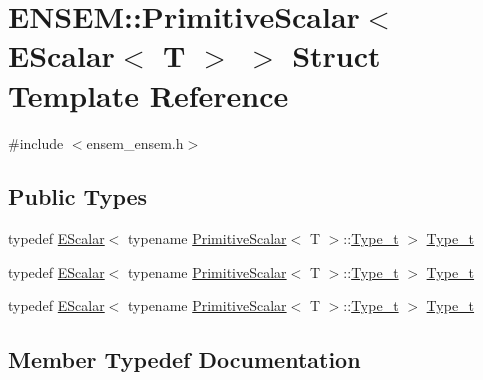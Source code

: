 \hypertarget{structENSEM_1_1PrimitiveScalar_3_01EScalar_3_01T_01_4_01_4}{}\section{E\+N\+S\+EM\+:\+:Primitive\+Scalar$<$ E\+Scalar$<$ T $>$ $>$ Struct Template Reference}
\label{structENSEM_1_1PrimitiveScalar_3_01EScalar_3_01T_01_4_01_4}


{\ttfamily \#include $<$ensem\+\_\+ensem.\+h$>$}

\subsection*{Public Types}
\begin{DoxyCompactItemize}
\item 
typedef \mbox{\hyperlink{classENSEM_1_1EScalar}{E\+Scalar}}$<$ typename \mbox{\hyperlink{structENSEM_1_1PrimitiveScalar}{Primitive\+Scalar}}$<$ T $>$\+::\mbox{\hyperlink{structENSEM_1_1PrimitiveScalar_3_01EScalar_3_01T_01_4_01_4_ae8493f2baf01f4ada1e2aec48076b72d}{Type\+\_\+t}} $>$ \mbox{\hyperlink{structENSEM_1_1PrimitiveScalar_3_01EScalar_3_01T_01_4_01_4_ae8493f2baf01f4ada1e2aec48076b72d}{Type\+\_\+t}}
\item 
typedef \mbox{\hyperlink{classENSEM_1_1EScalar}{E\+Scalar}}$<$ typename \mbox{\hyperlink{structENSEM_1_1PrimitiveScalar}{Primitive\+Scalar}}$<$ T $>$\+::\mbox{\hyperlink{structENSEM_1_1PrimitiveScalar_3_01EScalar_3_01T_01_4_01_4_ae8493f2baf01f4ada1e2aec48076b72d}{Type\+\_\+t}} $>$ \mbox{\hyperlink{structENSEM_1_1PrimitiveScalar_3_01EScalar_3_01T_01_4_01_4_ae8493f2baf01f4ada1e2aec48076b72d}{Type\+\_\+t}}
\item 
typedef \mbox{\hyperlink{classENSEM_1_1EScalar}{E\+Scalar}}$<$ typename \mbox{\hyperlink{structENSEM_1_1PrimitiveScalar}{Primitive\+Scalar}}$<$ T $>$\+::\mbox{\hyperlink{structENSEM_1_1PrimitiveScalar_3_01EScalar_3_01T_01_4_01_4_ae8493f2baf01f4ada1e2aec48076b72d}{Type\+\_\+t}} $>$ \mbox{\hyperlink{structENSEM_1_1PrimitiveScalar_3_01EScalar_3_01T_01_4_01_4_ae8493f2baf01f4ada1e2aec48076b72d}{Type\+\_\+t}}
\end{DoxyCompactItemize}


\subsection{Member Typedef Documentation}
\mbox{\label{structENSEM_1_1PrimitiveScalar_3_01EScalar_3_01T_01_4_01_4_ae8493f2baf01f4ada1e2aec48076b72d}} 
